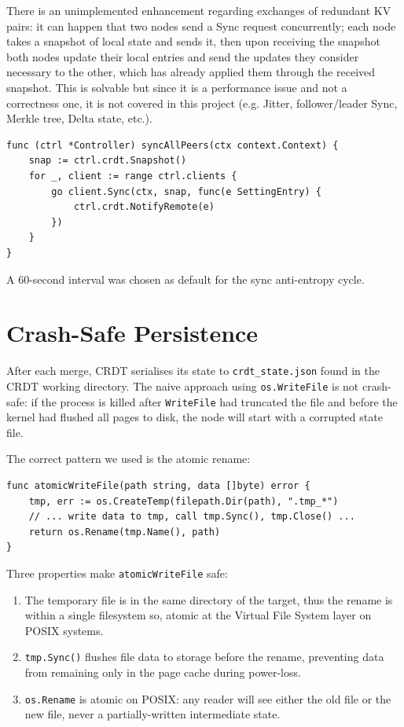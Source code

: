 \documentclass[conference]{IEEEtran}
\begin{document}
There is an unimplemented enhancement regarding exchanges of redundant KV pairs: it
can happen that two nodes send a Sync request {\color{violet}concurrently}; each node takes a snapshot
of local state and sends it, then upon receiving the snapshot both nodes update their local entries and send
the updates they consider necessary to the other, which has already applied them through the received snapshot.
This is solvable but since it is a performance issue and not a correctness one, it is not covered in this
project (e.g. Jitter, follower/leader Sync, Merkle tree, Delta state, etc.).

\begin{lstlisting}
func (ctrl *Controller) syncAllPeers(ctx context.Context) {
    snap := ctrl.crdt.Snapshot()
    for _, client := range ctrl.clients {
        go client.Sync(ctx, snap, func(e SettingEntry) {
            ctrl.crdt.NotifyRemote(e)
        })
    }
}
\end{lstlisting}

A 60-second interval was chosen as default for the sync anti-entropy cycle.

\section{Crash-Safe Persistence}
\label{sec:persistence}

After each merge, CRDT serialises its state to \texttt{crdt\_state.json} found in the CRDT
working directory. The naive approach using \texttt{os.WriteFile} is not crash-safe:
if the process is killed after \texttt{WriteFile} had truncated the file and before
the kernel had flushed all pages to disk, the node will start with a corrupted state file.

The correct pattern we used is the atomic rename:

\begin{lstlisting}
func atomicWriteFile(path string, data []byte) error {
    tmp, err := os.CreateTemp(filepath.Dir(path), ".tmp_*")
    // ... write data to tmp, call tmp.Sync(), tmp.Close() ...
    return os.Rename(tmp.Name(), path)
}
\end{lstlisting}

Three properties make \texttt{atomicWriteFile} safe:
\begin{enumerate}
  \item The temporary file is in the same directory of the target,
    thus the rename is within a single filesystem so, atomic
    at the Virtual File System layer on POSIX systems.
  \item \texttt{tmp.Sync()} flushes file data to storage before
    the rename, preventing data from remaining only in the page cache during power-loss.
  \item \texttt{os.Rename} is atomic on POSIX: any reader will see either the
    old file or the new file, never a partially-written intermediate state.
\end{enumerate}
\end{document}

